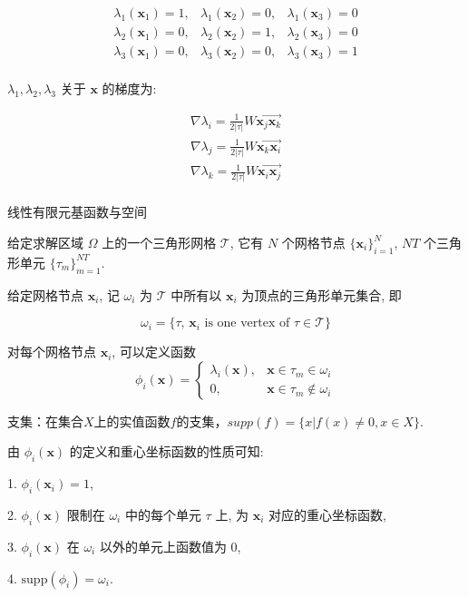 \documentclass{article}
\begin{document}
\begin{eqnarray*}
\lambda_1(\mathbf x_1) = 1,& \lambda_1(\mathbf x_2) = 0,& \lambda_1(\mathbf x_3) = 0\\
\lambda_2(\mathbf x_1) = 0,& \lambda_2(\mathbf x_2) = 1,& \lambda_2(\mathbf x_3) = 0\\
\lambda_3(\mathbf x_1) = 0,& \lambda_3(\mathbf x_2) = 0,& \lambda_3(\mathbf x_3) = 1\\
\end{eqnarray*}

$\lambda_1, \lambda_2, \lambda_3$ 关于 $\mathbf x$ 的梯度为:

$$
\begin{aligned}
\nabla\lambda_i = \frac{1}{2|\tau|}W\vec{\mathbf x_j\mathbf x_k}\\
\nabla\lambda_j = \frac{1}{2|\tau|}W\vec{\mathbf x_k\mathbf x_i}\\
\nabla\lambda_k = \frac{1}{2|\tau|}W\vec{\mathbf x_i\mathbf x_j}\\
\end{aligned}
$$

{\large 线性有限元基函数与空间}

给定求解区域 $\Omega$ 上的一个三角形网格 $\mathcal T$, 它有 $N$ 个网格节点 $\{\mathbf x_i\}_{i=1}^N$, $NT$ 个三角形单元 $\{\tau_m\}_{m=1}^{NT}$.


给定网格节点 $\mathbf x_i$, 记 $\omega_i$ 为 $\mathcal T$ 中所有以 $\mathbf x_i$ 为顶点的三角形单元集合, 即

$$
\omega_i = \{\tau,\,\mathbf x_i \text{ is one vertex of }\tau \in \mathcal T\}
$$

对每个网格节点 $\mathbf x_i$, 可以定义函数 
$$
\phi_i(\mathbf x) =
\begin{cases}
\lambda_i(\mathbf x),& \mathbf x \in \tau_m \in \omega_i\\
0, & \mathbf x \in \tau_m \notin \omega_i
\end{cases}
$$

支集：在集合$X$上的实值函数$f$的支集，$supp(f)=\lbrace x|f(x)\neq 0,x\in X\rbrace$.

由 $\phi_i(\mathbf x)$ 的定义和重心坐标函数的性质可知:

1. $\phi_i(\mathbf x_i)=1$,

2. $\phi_i(\mathbf x)$ 限制在 $\omega_i$ 中的每个单元 $\tau$ 上, 为 $\mathbf x_i$ 对应的重心坐标函数,

3. $\phi_i(\mathbf x)$ 在 $\omega_i$ 以外的单元上函数值为 0,

4. $\text{supp}(\phi_i)=\omega_i$.
\end{document}
